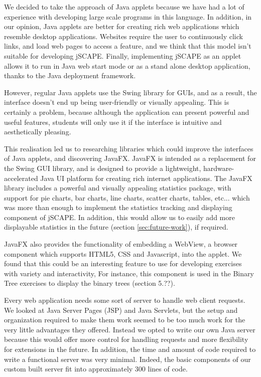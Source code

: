 We decided to take the approach of Java applets because we have had a lot of experience with developing large scale programs in this language. In addition, in our opinion, Java applets are better for creating rich web applications which resemble desktop applications. Websites require the user to continuously click links, and load web pages to access a feature, and we think that this model isn't suitable for developing jSCAPE. Finally, implementing jSCAPE as an applet allows it to run in Java web start mode or as a stand alone desktop application, thanks to the Java deployment framework. \newline

However, regular Java applets use the Swing library for GUIs, and as a result, the interface doesn't end up being user-friendly or visually appealing. This is certainly a problem, because although the application can present powerful and useful features, students will only use it if the interface is intuitive and aesthetically pleasing\cite{Interface-study}. \newline

This realisation led us to researching libraries which could improve the interfaces of Java applets, and discovering JavaFX. JavaFX is intended as a replacement for the Swing GUI library, and is designed to provide a lightweight, hardware-accelerated Java UI platform for creating rich internet applications\cite{JavaFX}. The JavaFX library includes a powerful and visually appealing statistics package, with support for pie charts, bar charts, line charts, scatter charts, tables, etc... which was more than enough to implement the statistics tracking and displaying component of jSCAPE. In addition, this would allow us to easily add more displayable statistics in the future (section \ref{sec:future-work}), if required. \newline

JavaFX also provides the functionality of embedding a \textsf{WebView}, a browser component which supports HTML5, CSS and Javascript, into the applet. We found that this could be an interesting feature to use for developing exercises with variety and interactivity, For instance, this component is used in the Binary Tree exercises to display the binary trees (section 5.??). \newline

Every web application needs some sort of server to handle web client requests. We looked at Java Server Pages (JSP) and Java Servlets, but the setup and organization required to make them work seemed to be too much work for the very little advantages they offered. Instead we opted to write our own Java server because this would offer more control for handling requests and more flexibility for extensions in the future. In addition, the time and amount of code required to write a functional server was very minimal. Indeed, the basic components of our custom built server fit into approximately 300 lines of code. \newline


